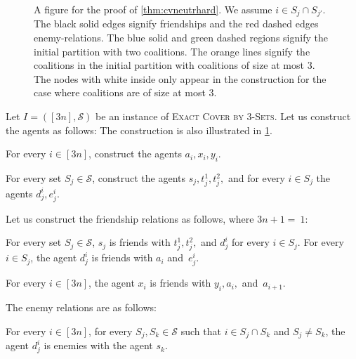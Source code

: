 \documentclass[a4paper,fleqn]{cas-sc}
\newcommand{\probname}[1]{\textsc{#1}}
\newcommand{\sets}{\ensuremath{\mathcal{S}}}
\newcommand{\elements}{\ensuremath{[3n]}}
\newcommand{\sset}[1]{\ensuremath{S_{#1}}}
\begin{document}
{\begin{figure}
    \caption{A figure for the proof of \cref{thm:cvneutrhard}. We assume $i \in S_j \cap S_{j'}$. The black solid edges signify friendships and the red dashed edges enemy-relations.
    The blue solid and green dashed regions signify the initial partition with two coalitions.
    The orange lines signify the coalitions in the initial partition with coalitions of size at most $3$.
    The nodes with white inside only appear in the construction for the case where coalitions are of size at most $3$.}
    \label{fig:cvneutrhard}
\end{figure}


Let $I = (\elements, \sets)$ be an instance of \probname{Exact Cover by 3-Sets}.
Let us construct the agents as follows:
The construction is also illustrated in \cref{fig:cvneutrhard}.
\begin{compactitem}
\item For every $i \in \elements$, construct the agents $a_i, x_i, y_i$.
\item For every set $\sset j \in \sets$, construct the agents $s_j, t^1_j, t^2_j,$ and for every $i \in \sset j$ the agents  $d^{i}_j, e^{i}_j$.
\end{compactitem}

Let us construct the friendship relations as follows, where $3n + 1 =~1$:
\begin{compactitem}
\item For every set $\sset j \in \sets$,  $s_j$ is friends with  $t^1_j, t^2_j,$ and $d^{i}_j$ for every $i \in \sset j$. For every $i \in \sset j$, the agent $d^{i}_j$ is friends with $a_{i}$ and~$e^{i}_j$.
\item For every $i \in \elements$, the agent $x_i$ is friends with $y_i, a_i,$ and~$a_{i + 1}$.
\end{compactitem}
The enemy relations are as follows:
\begin{compactitem}
\item For every $i \in \elements$, for every $\sset j, \sset k \in \sets$ such that $i \in \sset j \cap \sset k$ and $\sset j \neq \sset k$, the agent $d^i_j$ is enemies with the agent $s_k$.
\end{compactitem}

}
\end{document}
